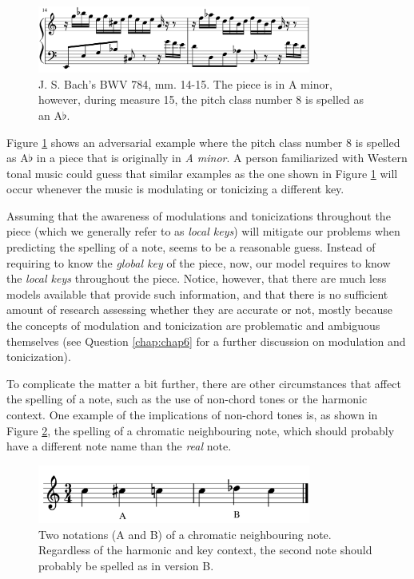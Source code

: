 \begin{figure}[h]
    \centering
    \includegraphics[width=0.8\textwidth]{figures/Q7_2.png}
    \caption{J. S. Bach's BWV 784, mm. 14-15. The piece is in A minor, however, during measure 15, the pitch class number 8 is spelled as an A$\flat$.}
    \label{fig:Q7_2}
\end{figure}

Figure \ref{fig:Q7_2} shows an adversarial example where the pitch class number 8 is spelled as A$\flat$ in a piece that is originally in \emph{A minor}. A person familiarized with Western tonal music could guess that similar examples as the one shown in Figure \ref{fig:Q7_2} will occur whenever the music is modulating or tonicizing a different key.

Assuming that the awareness of modulations and tonicizations throughout the piece (which we generally refer to as \emph{local keys}) will mitigate our problems when predicting the spelling of a note, seems to be a reasonable guess. Instead of requiring to know the \emph{global key} of the piece, now, our model requires to know the \emph{local keys} throughout the piece. Notice, however, that there are much less models available that provide such information, and that there is no sufficient amount of research assessing whether they are accurate or not, mostly because the concepts of modulation and tonicization are problematic and ambiguous themselves (see Question \ref{chap:chap6} for a further discussion on modulation and tonicization). 

To complicate the matter a bit further, there are other circumstances that affect the spelling of a note, such as the use of non-chord tones or the harmonic context. One example of the implications of non-chord tones is, as shown in Figure \ref{fig:Q7_3}, the spelling of a chromatic neighbouring note, which should probably have a different note name than the \emph{real} note.

\begin{figure}[h]
    \centering
    \includegraphics[width=0.8\textwidth]{figures/Q7_3.png}
    \caption{Two notations (A and B) of a chromatic neighbouring note. Regardless of the harmonic and key context, the second note should probably be spelled as in version B.}
    \label{fig:Q7_3}
\end{figure}

